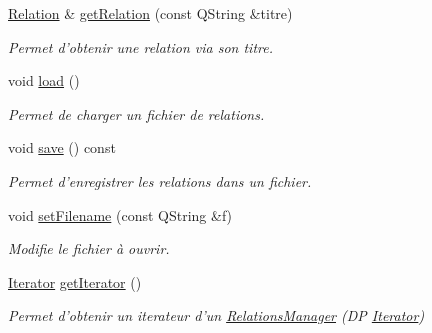 \begin{DoxyCompactItemize}
\hyperlink{class_relation}{Relation} \& \hyperlink{class_relations_manager_a5d8c2e75d674da855d3b018e2a5ae342}{get\-Relation} (const Q\-String \&titre)
\begin{DoxyCompactList}\small\item\em Permet d'obtenir une relation via son titre. \end{DoxyCompactList}\item 
\hypertarget{class_relations_manager_a6190c96cadd6b056cf94bfb75b5d56d1}{void \hyperlink{class_relations_manager_a6190c96cadd6b056cf94bfb75b5d56d1}{load} ()}\label{class_relations_manager_a6190c96cadd6b056cf94bfb75b5d56d1}

\begin{DoxyCompactList}\small\item\em Permet de charger un fichier de relations. \end{DoxyCompactList}\item 
\hypertarget{class_relations_manager_a8bb101094b5941f53e6d7abe5784ad6e}{void \hyperlink{class_relations_manager_a8bb101094b5941f53e6d7abe5784ad6e}{save} () const }\label{class_relations_manager_a8bb101094b5941f53e6d7abe5784ad6e}

\begin{DoxyCompactList}\small\item\em Permet d'enregistrer les relations dans un fichier. \end{DoxyCompactList}\item 
void \hyperlink{class_relations_manager_a846d7b926b24c57bb3523b582f5a0ea3}{set\-Filename} (const Q\-String \&f)
\begin{DoxyCompactList}\small\item\em Modifie le fichier à ouvrir. \end{DoxyCompactList}\item 
\hypertarget{class_relations_manager_a89cf8af20310718e9608672489683779}{\hyperlink{class_relations_manager_1_1_iterator}{Iterator} \hyperlink{class_relations_manager_a89cf8af20310718e9608672489683779}{get\-Iterator} ()}\label{class_relations_manager_a89cf8af20310718e9608672489683779}

\begin{DoxyCompactList}\small\item\em Permet d'obtenir un iterateur d'un \hyperlink{class_relations_manager}{Relations\-Manager} (D\-P \hyperlink{class_relations_manager_1_1_iterator}{Iterator}) \end{DoxyCompactList}\end{DoxyCompactItemize}
